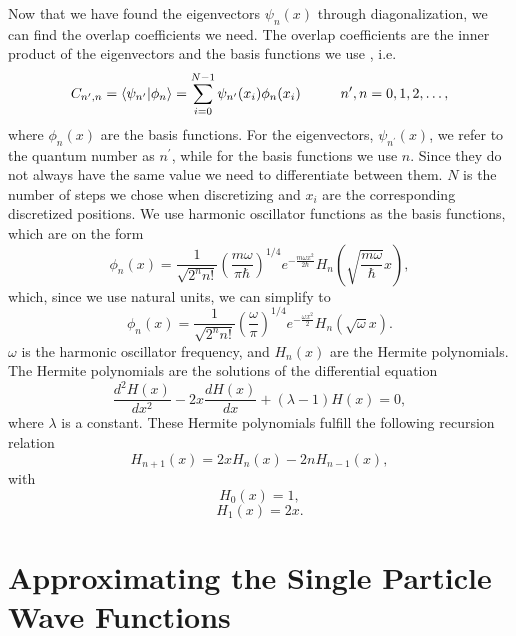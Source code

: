 \documentclass[../main.tex]{subfiles}
\begin{document}
Now that we have found the eigenvectors $\psi_n(x)$ through diagonalization, we can find the overlap coefficients we need. The overlap coefficients are the inner product of the eigenvectors and the basis functions we use \cite{Yang}, i.e.
\begin{equation}\label{eq:OverlapCoefficients}
    C_{n^\prime,n} = \langle \psi_{n^\prime} \vert \phi_n\rangle = \sum_{i=0}^{N-1} \psi_{n^\prime}(x_i)\phi_n(x_i) \hspace{1 cm} n^\prime,n = 0,1,2,\dots,
\end{equation}
where $\phi_n(x)$ are the basis functions. For the eigenvectors, $\psi_{n^\prime}(x)$, we refer to the quantum number as $n^\prime$, while for the basis functions we use $n$. Since they do not always have the same value we need to differentiate between them. $N$ is the number of steps we chose when discretizing and $x_i$ are the corresponding discretized positions. We use harmonic oscillator functions as the basis functions, which are on the form
\begin{equation}
    \phi_n(x) = \frac{1}{\sqrt{2^n n!}} \left(\frac{m\omega}{\pi\hbar}\right)^{1/4} e^{-\frac{m\omega x^2}{2\hbar}} H_n\left(\sqrt{\frac{m\omega}{\hbar}}x\right),
\end{equation}
which, since we use natural units, we can simplify to
\begin{equation}\label{eq: Basis Functions}
    \phi_n(x) = \frac{1}{\sqrt{2^n n!}} \left(\frac{\omega}{\pi}\right)^{1/4} e^{-\frac{\omega x^2}{2}} H_n\left(\sqrt{\omega}x\right).
\end{equation}
$\omega$ is the harmonic oscillator frequency, and $H_n(x)$ are the Hermite polynomials. The Hermite polynomials are the solutions of the differential equation
\begin{equation}
    \frac{d^2H(x)}{dx^2}-2x\frac{dH(x)}{dx}+(\lambda-1)H(x)=0,
\end{equation}
where $\lambda$ is a constant. These Hermite polynomials fulfill the following recursion relation
\begin{equation}
    H_{n+1}(x)=2xH_{n}(x)-2nH_{n-1}(x),
\end{equation}
with
\begin{equation}
    H_0(x) = 1,
\end{equation}
\begin{equation}
    H_1(x) = 2x.
\end{equation}



\section{Approximating the Single Particle Wave Functions}\label{sec:AppSPWF}
\end{document}
